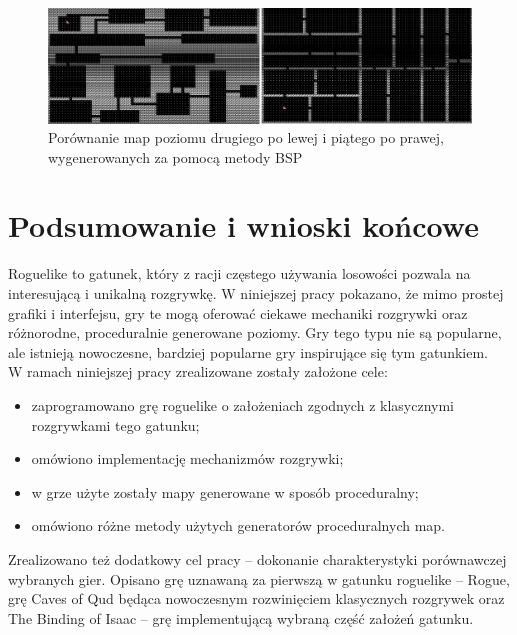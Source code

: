 \documentclass[12pt,twoside]{article}
\begin{document}
\FloatBarrier
\begin{figure}[ht]
	\centering
	\includegraphics[width=16cm]{images/generators/bsp_diff.png}
	\caption{Porównanie map poziomu drugiego po lewej i piątego po prawej, wygenerowanych za pomocą metody BSP}
	\label{generators:bsp_diff}
\end{figure}
\FloatBarrier




\clearpage

\section*{Podsumowanie i wnioski końcowe}

Roguelike to gatunek, który z racji częstego używania losowości pozwala na interesującą i unikalną rozgrywkę. W niniejszej pracy pokazano, że mimo prostej grafiki i interfejsu, gry te mogą oferować ciekawe mechaniki rozgrywki oraz różnorodne, proceduralnie generowane poziomy. Gry tego typu nie są popularne, ale istnieją nowoczesne, bardziej popularne gry inspirujące się tym gatunkiem. \\ 


W ramach niniejszej pracy zrealizowane zostały założone cele: 
\begin{itemize}
	\item zaprogramowano grę roguelike o założeniach zgodnych z klasycznymi rozgrywkami tego gatunku;
	\item omówiono implementację mechanizmów rozgrywki;
	\item w grze użyte zostały mapy generowane w sposób proceduralny;
	\item omówiono różne metody użytych generatorów proceduralnych map.
\end{itemize}

Zrealizowano też dodatkowy cel pracy -- dokonanie charakterystyki porównawczej wybranych gier. Opisano grę uznawaną za pierwszą w gatunku roguelike -- Rogue, grę Caves of Qud będąca nowoczesnym rozwinięciem klasycznych rozgrywek oraz The Binding of Isaac -- grę implementującą wybraną część założeń gatunku. \\
\end{document}
